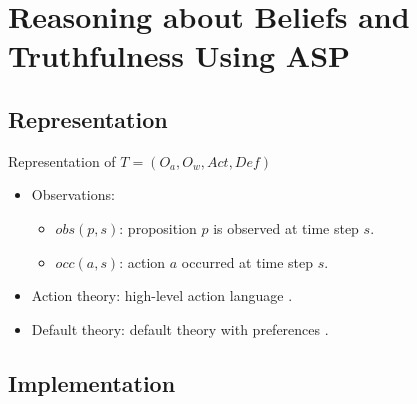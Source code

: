 \documentclass[unknownkeysallowed]{beamer}
\begin{document}
\section{Reasoning about Beliefs and Truthfulness Using ASP} 

\subsection*{Representation}

\begin{frame}{}

Representation of $T = (O_a, O_w, Act, \textit{Def})$ 
\begin{itemize} 

\item \alert{Observations}: 


\begin{itemize} 
\item $obs(p, s)$: proposition $p$ is observed at time step $s$. 
\item $occ(a, s)$: action $a$ occurred at time step $s$.
\end{itemize}


\item \alert{Action theory}: high-level action language  
\cite{GelfondL98}. 

\item \alert{Default theory}: default theory with preferences  \cite{GelfondS98}.  
\end{itemize}

\end{frame}

\subsection*{Implementation}
\end{document}
